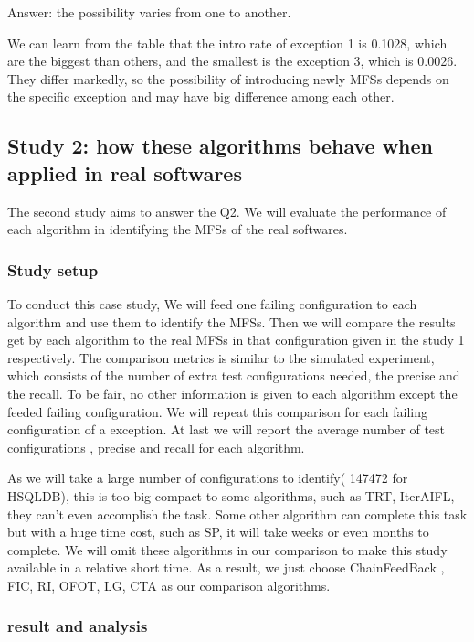 \documentclass[10pt,journal,cspaper,compsoc]{IEEEtran}
\begin{document}
Answer: the possibility varies from one to another.

We can learn from the table that the intro rate of exception 1 is 0.1028, which are the biggest than others, and the smallest is the exception 3, which is 0.0026. They differ markedly, so the possibility of introducing newly MFSs depends on the specific exception and may have big difference among each other.

\subsection{Study 2: how these algorithms behave when applied in real softwares}
The second study aims to answer the Q2. We will evaluate the performance of each algorithm in identifying the MFSs of the real softwares.
\subsubsection{Study setup}
To conduct this case study, We will feed one failing configuration to each algorithm and use them to identify the MFSs. Then we will compare the results get by each algorithm to the real MFSs in that configuration given in the study 1 respectively. The comparison metrics is similar to the simulated experiment, which consists of  the number of extra test configurations needed, the precise and the recall. To be fair, no other information is given to each algorithm except the feeded failing configuration. We will repeat this comparison for each failing configuration of a exception. At last we will report the average number of test configurations , precise and recall for each algorithm.

As we will take a large number of configurations to identify( 147472 for HSQLDB), this is too big compact to some algorithms, such as TRT, IterAIFL, they can't even accomplish the task. Some other algorithm can complete this task but with a huge time cost, such as SP, it will take weeks or even months to complete. We will omit these algorithms in our comparison to make this study available in a relative short time. As a result, we just choose ChainFeedBack , FIC, RI, OFOT, LG, CTA as our comparison algorithms.

 \subsubsection{result and analysis}
\end{document}
